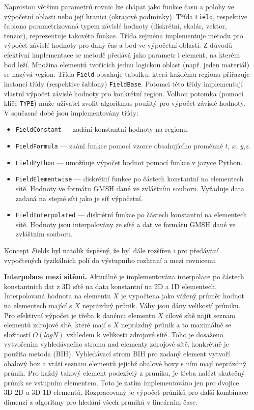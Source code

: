 \documentclass[11pt]{report}
\begin{document}
Naprostou většinu parametrů rovnic lze chápat jako funkce času a polohy ve 
výpočetní oblasti nebo její hranici (okrajové podmínky).  Třída 
\verb'Field', respektive šablona parametrizovaná typem 
závislé hodnoty (diskrétní, skalár, vektor, tenzor), reprezentuje 
takovéto funkce. Třída zejména implementuje  metodu pro výpočet 
závislé hodnoty pro daný čas a bod ve výpočetní oblasti.
Z důvodů efektivní implementace se metodě předává jako parametr i 
element, na kterém bod leží. Množina elementů tvořících jednu logickou 
oblast (např. jeden materiál) se nazývá {\emph region}. Třída \verb'Field' 
obsahuje tabulku, která každému regionu přiřazuje instanci třídy (respektive 
šablony) \verb'FieldBase'. Potomci této třídy implementují vlastní výpočet 
závislé hodnoty pro konkrétní region. Volbou potomka (pomocí klíče 
\verb'TYPE') může uživatel zvolit algoritmus použitý pro výpočet závislé 
hodnoty. V současné době jsou implementovány třídy:
\begin{itemize}
 \item {\tt FieldConstant} 
 --- zadání konstantní hodnoty na regionu.
 \item {\tt FieldFormula} 
 --- zaání funkce pomocí vzorce obsahujícího proměnné 
 $t$, $x$, $y$,$z$.
 \item {\tt FieldPython} 
 --- umožňuje výpočet hodnot pomocí funkce v jazyce Python.
 \item {\tt FieldElementwise} 
 --- diskrétní funkce po částech konstantní na elementech sítě. Hodnoty 
ve formátu GMSH dané ve zvláštním souboru. Vyžaduje data zadaná na stejné síti 
jako je síť výpočetní. 

 \item {\tt FieldInterpolated}
 --- diskrétní funkce po částech konstantní na elementech sítě. Hodnoty 
jsou interpolovány ze sítě a dat ve formátu GMSH dané ve zvláštním souboru.
\end{itemize}

Koncept {\emph Fields} byl natolik úspěšný, že byl dále rozšířen i pro 
předávání vypočtených fyzikálních polí do výstupního rozhraní a mezi 
rovnicemi.

{\bf Interpolace mezi sítěmi.}
Aktuálně je implementována interpolace po částech konstantních dat z 3D sítě na 
data konstantní na 2D a 1D elementech. Interpolovaná hodnota na elementu $X$ je 
vypočtena jako vážený průměr hodnot na elementech mající s $X$ neprázdný 
průnik. Váhy jsou dány velikostí průniku.
Pro efektivní výpočet je třeba k danému 
elementu $X$ cílové sítě najít seznam elementů zdrojové sítě, které mají s $X$ 
neprázdný průnik a to maximálně se složitostí $O(log N)$ vzhledem k velikosti 
zdrojové sítě. Toho je dosaženo vytvořením vyhledávacího stromu nad elementy 
zdrojové sítě, konkrétně je použita metoda 
(BIH). 
Vyhledávací strom BIH pro zadaný element vytvoří obalový box a vrátí seznam 
elementů jejichž obalové boxy s ním mají neprázdný průnik. Pro každý takový 
element podezřelý z průniku, je třeba nalézt skutečný průnik se vstupním 
elementem. Toto je zatím implementováno jen pro dvojice 3D-2D a 3D-1D elementů. 
Rozpracovaný je výpočet průniků pro další kombinace dimenzí a algoritmy 
pro hledání všech průniků v lineárním čase.
\end{document}
